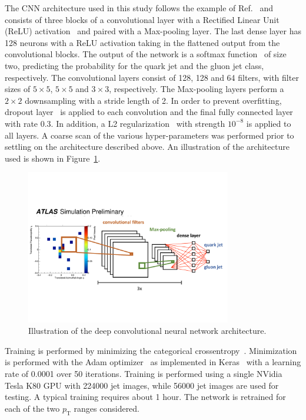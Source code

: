 The CNN architecture used in this study follows the example of Ref.~\cite{Komiske:2016rsd} and consists of three blocks of a convolutional layer with a
Rectified Linear Unit (ReLU) activation~\cite{RELU} and paired with a Max-pooling layer.
The last dense layer has 128 neurons with a ReLU activation taking in the flattened output from the convolutional blocks.
The output of the network is a softmax function~\cite{dlbook} of size two, 
predicting the probability for the quark jet and the gluon jet class, respectively. 
The convolutional layers consist of 128, 128 and 64 filters, with filter sizes of $5\times5$, $5\times5$ and $3\times3$, respectively.
The Max-pooling layers perform a $2\times2$ downsampling with a stride length of 2.
In order to prevent overfitting, dropout layer~\cite{Goodfellow-et-al-2016-Book} is applied to each convolution and the final fully connected layer with rate 0.3.
In addition, a L2 regularization~\cite{Goodfellow-et-al-2016-Book} with strength $10^{-8}$ is applied to all layers.  
A coarse scan of the various hyper-parameters was performed prior to settling on the architecture described above.
An illustration of the architecture used is shown in Figure~\ref{fig:networkarch}.

\begin{figure}[htpb]
\begin{center}
\includegraphics[width=0.8\textwidth]{figures/CNN/network.pdf}
\caption{Illustration of the deep convolutional neural network architecture.}
\label{fig:networkarch}
\end{center}
\end{figure}

Training is performed by minimizing the categorical crossentropy~\cite{Goodfellow-et-al-2016-Book}.
Minimization is performed with the Adam optimizer~\cite{DBLP:journals/corr/KingmaB14} 
as implemented in Keras~\cite{keras}
with a learning rate of 0.0001 over 50 iterations.
Training is performed using a single NVidia Tesla K80 GPU with 224000 jet images, while 56000 jet images are used for testing.
A typical training requires about 1 hour.
The network is retrained for each of the two $p_\text{T}$ ranges considered.

